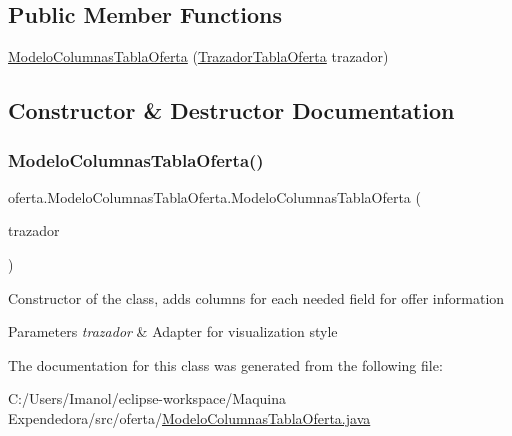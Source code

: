 \subsection*{Public Member Functions}
\begin{DoxyCompactItemize}
\item 
\mbox{\hyperlink{classoferta_1_1_modelo_columnas_tabla_oferta_a515b619b8691023cf601ed3ca2d5d0e5}{Modelo\+Columnas\+Tabla\+Oferta}} (\mbox{\hyperlink{classoferta_1_1_trazador_tabla_oferta}{Trazador\+Tabla\+Oferta}} trazador)
\end{DoxyCompactItemize}


\subsection{Constructor \& Destructor Documentation}
\mbox{\label{classoferta_1_1_modelo_columnas_tabla_oferta_a515b619b8691023cf601ed3ca2d5d0e5}} 
\subsubsection{\texorpdfstring{Modelo\+Columnas\+Tabla\+Oferta()}{ModeloColumnasTablaOferta()}}
{\footnotesize\ttfamily oferta.\+Modelo\+Columnas\+Tabla\+Oferta.\+Modelo\+Columnas\+Tabla\+Oferta (\begin{DoxyParamCaption}\item[{\mbox{\hyperlink{classoferta_1_1_trazador_tabla_oferta}{Trazador\+Tabla\+Oferta}}}]{trazador }\end{DoxyParamCaption})}

Constructor of the class, adds columns for each needed field for offer information 
\begin{DoxyParams}{Parameters}
{\em trazador} & Adapter for visualization style \\
\hline
\end{DoxyParams}


The documentation for this class was generated from the following file\+:\begin{DoxyCompactItemize}
\item 
C\+:/\+Users/\+Imanol/eclipse-\/workspace/\+Maquina Expendedora/src/oferta/\mbox{\hyperlink{_modelo_columnas_tabla_oferta_8java}{Modelo\+Columnas\+Tabla\+Oferta.\+java}}\end{DoxyCompactItemize}
